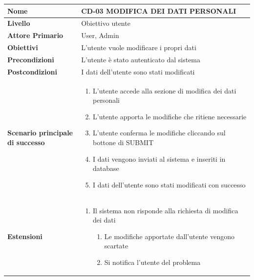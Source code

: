 \begin{center}
    \begin{tabular}{|p{0.3\linewidth}|p{0.7\linewidth}|}
    \hline
    \rowcolor{Blue}
    \textbf{Nome} & CD-03 MODIFICA DEI DATI PERSONALI \\
    \hline
    \rowcolor{DarkBlue}
    \textbf{Livello} & Obiettivo utente \\
    \hline
    \rowcolor{LightBlue}
    \textbf{Attore Primario} & User, Admin \\
    \hline
    \rowcolor{LightBlue}
    \textbf{Obiettivi} & L'utente vuole modificare i propri dati \\
    \hline
    \rowcolor{Blue}
    \textbf{Precondizioni} & L’utente è stato autenticato dal sistema \\
    \hline
    \rowcolor{LightBlue}
    \textbf{Postcondizioni} & I dati dell’utente sono stati modificati \\
    \hline
    \rowcolor{LighterBlue}
        \begin{center}
        \textbf{Scenario principale di successo}
    \end{center} 
    & 
    \begin{enumerate}
        \item L’utente accede alla sezione di modifica dei dati personali
        \item L’utente apporta le modifiche che ritiene necessarie
        \item L’utente conferma le modifiche cliccando sul bottone di SUBMIT
        \item I dati vengono inviati al sistema e inseriti in database
        \item I dati dell’utente sono stati modificati con successo
    \end{enumerate}
    \\
    \hline
    \rowcolor{LighterBlue}
    \begin{center}
        \textbf{Estensioni}
    \end{center} 
    & 
    \begin{enumerate}
        \item Il sistema non risponde alla richiesta di modifica dei dati
        \begin{enumerate}
            \item Le modifiche apportate dall’utente vengono scartate
            \item Si notifica l’utente del problema
        \end{enumerate}
    \end{enumerate}
    \\
    \hline
    \end{tabular}
\end{center}

